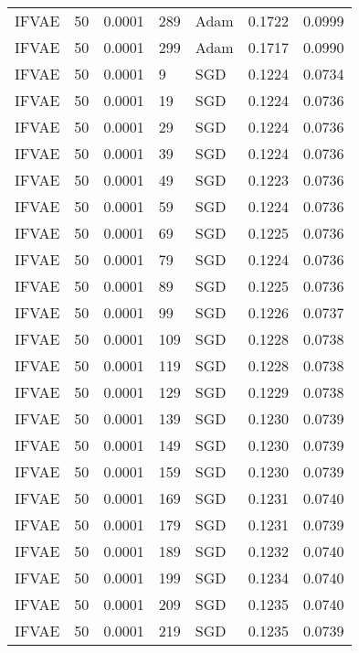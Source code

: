 \begin{tabular}{llrllrr}
 IFVAE &   50 &  0.0001 &   289 &      Adam &  0.1722 &       0.0999 \\
 IFVAE &   50 &  0.0001 &   299 &      Adam &  0.1717 &       0.0990 \\
 IFVAE &   50 &  0.0001 &     9 &       SGD &  0.1224 &       0.0734 \\
 IFVAE &   50 &  0.0001 &    19 &       SGD &  0.1224 &       0.0736 \\
 IFVAE &   50 &  0.0001 &    29 &       SGD &  0.1224 &       0.0736 \\
 IFVAE &   50 &  0.0001 &    39 &       SGD &  0.1224 &       0.0736 \\
 IFVAE &   50 &  0.0001 &    49 &       SGD &  0.1223 &       0.0736 \\
 IFVAE &   50 &  0.0001 &    59 &       SGD &  0.1224 &       0.0736 \\
 IFVAE &   50 &  0.0001 &    69 &       SGD &  0.1225 &       0.0736 \\
 IFVAE &   50 &  0.0001 &    79 &       SGD &  0.1224 &       0.0736 \\
 IFVAE &   50 &  0.0001 &    89 &       SGD &  0.1225 &       0.0736 \\
 IFVAE &   50 &  0.0001 &    99 &       SGD &  0.1226 &       0.0737 \\
 IFVAE &   50 &  0.0001 &   109 &       SGD &  0.1228 &       0.0738 \\
 IFVAE &   50 &  0.0001 &   119 &       SGD &  0.1228 &       0.0738 \\
 IFVAE &   50 &  0.0001 &   129 &       SGD &  0.1229 &       0.0738 \\
 IFVAE &   50 &  0.0001 &   139 &       SGD &  0.1230 &       0.0739 \\
 IFVAE &   50 &  0.0001 &   149 &       SGD &  0.1230 &       0.0739 \\
 IFVAE &   50 &  0.0001 &   159 &       SGD &  0.1230 &       0.0739 \\
 IFVAE &   50 &  0.0001 &   169 &       SGD &  0.1231 &       0.0740 \\
 IFVAE &   50 &  0.0001 &   179 &       SGD &  0.1231 &       0.0739 \\
 IFVAE &   50 &  0.0001 &   189 &       SGD &  0.1232 &       0.0740 \\
 IFVAE &   50 &  0.0001 &   199 &       SGD &  0.1234 &       0.0740 \\
 IFVAE &   50 &  0.0001 &   209 &       SGD &  0.1235 &       0.0740 \\
 IFVAE &   50 &  0.0001 &   219 &       SGD &  0.1235 &       0.0739 \\

\end{tabular}
